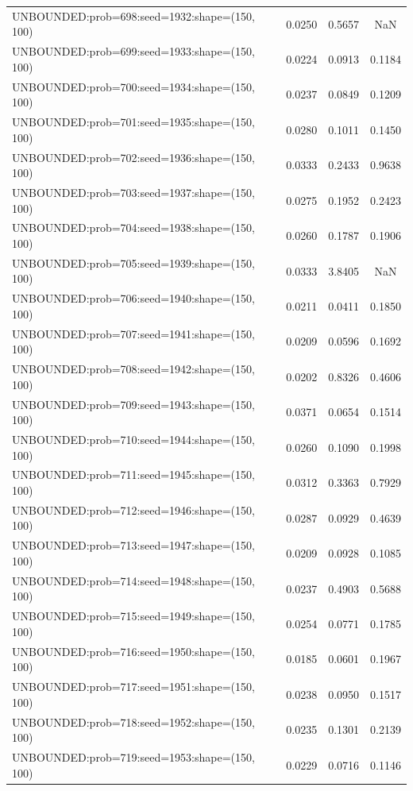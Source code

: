 \begin{longtable}{lccc}
UNBOUNDED:prob=698:seed=1932:shape=(150, 100) &   0.0250 &  0.5657 &     NaN \\
UNBOUNDED:prob=699:seed=1933:shape=(150, 100) &   0.0224 &  0.0913 &  0.1184 \\
UNBOUNDED:prob=700:seed=1934:shape=(150, 100) &   0.0237 &  0.0849 &  0.1209 \\
UNBOUNDED:prob=701:seed=1935:shape=(150, 100) &   0.0280 &  0.1011 &  0.1450 \\
UNBOUNDED:prob=702:seed=1936:shape=(150, 100) &   0.0333 &  0.2433 &  0.9638 \\
UNBOUNDED:prob=703:seed=1937:shape=(150, 100) &   0.0275 &  0.1952 &  0.2423 \\
UNBOUNDED:prob=704:seed=1938:shape=(150, 100) &   0.0260 &  0.1787 &  0.1906 \\
UNBOUNDED:prob=705:seed=1939:shape=(150, 100) &   0.0333 &  3.8405 &     NaN \\
UNBOUNDED:prob=706:seed=1940:shape=(150, 100) &   0.0211 &  0.0411 &  0.1850 \\
UNBOUNDED:prob=707:seed=1941:shape=(150, 100) &   0.0209 &  0.0596 &  0.1692 \\
UNBOUNDED:prob=708:seed=1942:shape=(150, 100) &   0.0202 &  0.8326 &  0.4606 \\
UNBOUNDED:prob=709:seed=1943:shape=(150, 100) &   0.0371 &  0.0654 &  0.1514 \\
UNBOUNDED:prob=710:seed=1944:shape=(150, 100) &   0.0260 &  0.1090 &  0.1998 \\
UNBOUNDED:prob=711:seed=1945:shape=(150, 100) &   0.0312 &  0.3363 &  0.7929 \\
UNBOUNDED:prob=712:seed=1946:shape=(150, 100) &   0.0287 &  0.0929 &  0.4639 \\
UNBOUNDED:prob=713:seed=1947:shape=(150, 100) &   0.0209 &  0.0928 &  0.1085 \\
UNBOUNDED:prob=714:seed=1948:shape=(150, 100) &   0.0237 &  0.4903 &  0.5688 \\
UNBOUNDED:prob=715:seed=1949:shape=(150, 100) &   0.0254 &  0.0771 &  0.1785 \\
UNBOUNDED:prob=716:seed=1950:shape=(150, 100) &   0.0185 &  0.0601 &  0.1967 \\
UNBOUNDED:prob=717:seed=1951:shape=(150, 100) &   0.0238 &  0.0950 &  0.1517 \\
UNBOUNDED:prob=718:seed=1952:shape=(150, 100) &   0.0235 &  0.1301 &  0.2139 \\
UNBOUNDED:prob=719:seed=1953:shape=(150, 100) &   0.0229 &  0.0716 &  0.1146 \\

\end{longtable}
